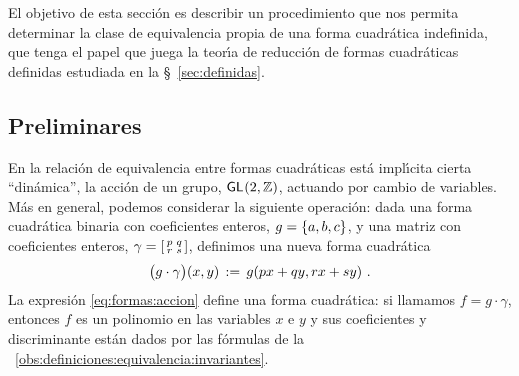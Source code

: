 \theoremstyle{plain}
\newtheorem{teoIndefinidas}{\teoname}[section]
\newtheorem{lemaIndefinidas}[teoIndefinidas]{\lemaname}

\theoremstyle{definition}
\newtheorem{defIndefinidas}[teoIndefinidas]{}
\newtheorem{ejemIndefinidas}[teoIndefinidas]{\ejemname}


El objetivo de esta secci\'on es describir un procedimiento que nos permita
determinar la clase de equivalencia propia de una forma cuadr\'atica
indefinida, que tenga el papel que juega la teor\'{\i}a de reducci\'on
de formas cuadr\'aticas definidas estudiada en la \S~\ref{sec:definidas}.

\subsection{Preliminares}
En la relaci\'on de equivalencia entre formas cuadr\'aticas est\'a
impl\'{\i}cita cierta ``din\'amica'', la acci\'on de un grupo,
$\mathsf{GL}_{}(2,\mathbb{Z})$, actuando por cambio de variables.
M\'as en general, podemos considerar la siguiente operaci\'on:
dada una forma cuadr\'atica binaria con coeficientes enteros,
$g=\left\{a,b,c\right\}$, y una matriz con coeficientes enteros,
$\gamma= \left[\begin{smallmatrix}  p & q \\ r & s  \end{smallmatrix}\right]$, definimos una nueva
forma cuadr\'atica
\begin{equation}
	\label{eq:formas:accion}
	\big(g\cdot\gamma\big)(x,y)\,:=\,g(px+qy,rx+sy)
	\text{ .}
\end{equation}
%
La expresi\'on \eqref{eq:formas:accion} define una forma cuadr\'atica:
si llamamos $f=g\cdot\gamma$, entonces $f$ es un polinomio en las variables
$x$ e $y$ y sus coeficientes y discriminante est\'an dados por las
f\'ormulas de la \obsname~\ref{obs:definiciones:equivalencia:invariantes}.
%

